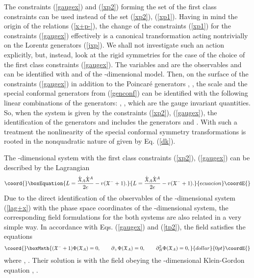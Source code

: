 \documentclass[a4paper,12pt]{article}
\def\X{\mathfrak X}
\def\P{\mathfrak P}
\def\K{\mathfrak K}
\def\J{\mathfrak J}
\def\D{\mathfrak D}
\begin{document}
The constraints (\ref{gaugex}) and (\ref{xp2})
forming  the set of the first class constraints
can be used instead of the set
(\ref{xp2}), (\ref{xp1}).
Having in mind the origin of the relations
(\ref{x+p-}), the change of the constraints
(\ref{xp1}) for
the constraints
(\ref{gaugex}) effectively is a canonical transformation
acting nontrivially on the Lorentz generators (\ref{jxp}).
We shall not investigate such an action explicitly,
but,
instead, look at the rigid symmetries
for the case of the choice of the first class constraints
(\ref{gaugex}).
The variables \myHighlight{$\X_\mu$}\coordHE{} and \myHighlight{$\P_\mu$}\coordHE{}
are the observables and can be identified with
\coordHE{} and \coordHE{} of the \coordHE{}-dimensional model.
Then, on the surface of the constraints (\ref{gaugex})
in addition to the Poincar\'e generators
\myHighlight{$J_{\mu\nu}=\J_{\mu\nu}$}\coordHE{}, \myHighlight{$P_\mu=\P_\mu=\J_{\mu +}$}\coordHE{},
the scale and the special conformal
generators from (\ref{genconf}) can be identified
with the following linear combinations
of the \coordHE{} generators:
\myHighlight{$D=\P_-+\D=P_--(\K_d+\K_{d+1})$}\coordHE{},
\myHighlight{$K_\mu=\K_\mu+\J_{\mu-}$}\coordHE{},
which are the gauge invariant quantities.
So, when the system is given by
the constraints (\ref{xp2}),
(\ref{gaugex}),
the identification of the
generators \coordHE{} and \coordHE{} includes
the \coordHE{} generators
\myHighlight{$\D$}\coordHE{} and \myHighlight{$\K_A$}\coordHE{}.
With such a treatment the nonlinearity of the special
conformal symmetry transformations
is rooted in the nonquadratic nature of \myHighlight{$\K_A$}\coordHE{}
given by Eq. (\ref{dk}).


The \coordHE{}-dimensional system with the
first class constraints
(\ref{xp2}), (\ref{gaugex})
can be described by the  Lagrangian
\begin{equation}\coord{}\boxEquation{
L=\frac{\dot{\X}_A\dot{\X}{}^A}{2e}
-v(\X^-+1).
\label{lag+x}
}{
L=\frac{\dot{\X}_A\dot{\X}{}^A}{2e}
-v(\X^-+1).
}{ecuacion}\coordE{}\end{equation}
Due to the direct identification of the
observables of the \coordHE{}-dimensional
system (\ref{lag+x})
with the phase space coordinates of the
\coordHE{}-dimensional system, the corresponding
field formulations for the both systems
are also related in a very simple way.
In accordance with Eqs. (\ref{gaugex})
and (\ref{tp2}),
the field \myHighlight{$\Phi(\X_A)$}\coordHE{} satisfies
the equations
$$\coord{}\boxMath{
(\X^-+1)\Phi(\X_A)=0,\qquad
\partial_+\Phi(\X_A)=0,\qquad
\partial_B^2\Phi(\X_A)=0,
}{dollar}{0pt}\coordE{}$$
where
\myHighlight{$\partial_B=\partial/\partial \X^B$}\coordHE{},
\myHighlight{$\partial_+=\partial/\partial \X^+$}\coordHE{}.
Their solution is
\myHighlight{$\Phi(\X_A)=
\delta(X^-+1)\varphi(\X_\nu)$}\coordHE{}
with the field
\myHighlight{$\varphi(\X_\nu)$}\coordHE{}
obeying the \coordHE{}-dimensional Klein-Gordon
equation \myHighlight{$\partial_\mu^2\varphi(\X_\nu)=0$}\coordHE{},
\myHighlight{$\partial_\mu=\partial/\partial \X^\mu$}\coordHE{}.
\end{document}
